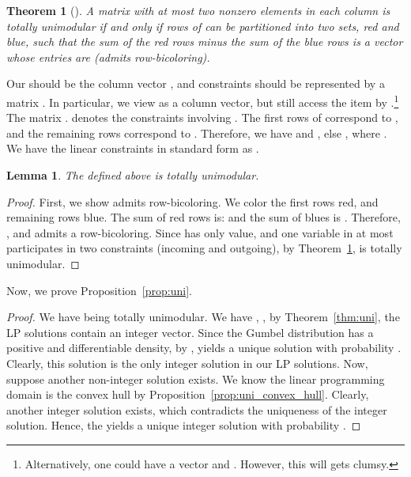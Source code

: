\documentclass[11pt]{article}
\newtheorem{theorem}{Theorem}
\newtheorem{lemma}{Lemma}
\begin{document}
\begin{theorem}[]\label{tm:bi}
A  matrix  with at most two nonzero elements in
each column is totally unimodular if and only if rows of  can be partitioned into two sets, red and blue, such that the sum of the red rows minus the sum of the blue rows is a vector whose entries are  (admits row-bicoloring).
\end{theorem}
Our  should be the column vector , and constraints should be represented by a matrix . In particular, we view  as a column vector, but still access the item by .\footnote{Alternatively, one could have a  vector  and . However, this will gets clumsy.} The matrix .  denotes the constraints involving  . The first  rows of  correspond to , and the remaining  rows correspond to . Therefore, we have  and , else , where . We have the linear constraints in standard form as .
\begin{lemma}
The  defined above is totally unimodular.
\end{lemma}
\begin{proof}
First, we show  admits row-bicoloring. We color the first  rows red, and remaining  rows blue. The sum of red rows is:  and the sum of blues is . Therefore,  , and  admits a row-bicoloring. Since  has only  value, and one variable in  at most participates in two constraints (incoming and outgoing), by Theorem~\ref{tm:bi},  is totally unimodular. 
\end{proof}
Now, we prove Proposition~\ref{prop:uni}.
\begin{proof} \label{prof:uni}
We have  being totally unimodular. We have   , , by Theorem~\ref{thm:uni}, the LP solutions contain an integer vector. Since the Gumbel distribution has a positive and differentiable density,  by \cite[Proposition~3]{Paulus2020GradientEW},    yields a unique solution with probability . Clearly, this solution is the only integer solution in our LP solutions. Now, suppose another non-integer solution exists. We know the linear programming domain is the convex hull by Proposition~\ref{prop:uni_convex_hull}. Clearly, another integer solution exists, which contradicts the uniqueness of the integer solution. Hence, the   yields a unique integer solution with probability .
\end{proof}
\end{document}
